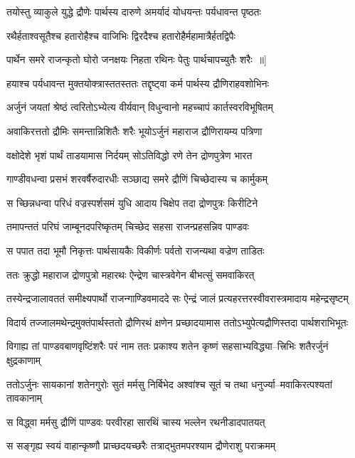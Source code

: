 \twolineshloka
{तयोस्तु व्याकुले युद्धे द्रौणेः पार्थस्य दारुणे}
{अमर्यादं योधयन्तः पर्यधावन्त पृष्ठतः}


\twolineshloka
{रथैर्हताश्वसूतैश्च हतारोहैश्च वाजिभिः}
{द्विरदैश्च हतारोहैर्महामात्रैर्हतद्विपैः}


\twolineshloka
{पार्थेन समरे राजन्कृतो घोरो जनक्षयः}
{निहता रथिनः पेतुः पार्थचापच्युतैः शरैः ॥]}


\twolineshloka
{हयाश्च पर्यधावन्त मुक्तयोक्त्रास्ततस्ततः}
{तद्दृष्ट्वा कर्म पार्थस्य द्रौणिराहवशोभिनः}


\twolineshloka
{अर्जुनं जयतां श्रेष्ठं त्वरितोऽभ्येत्य वीर्यवान्}
{विधुन्वानो महच्चापं कार्तस्वरविभूषितम्}


\twolineshloka
{अवाकिरत्ततो द्रौमिः समन्तान्निशितैः शरैः}
{भूयोऽर्जुनं महाराज द्रौणिरायम्य पत्रिणा}


\twolineshloka
{वक्षोदेशे भृशं पार्थं ताडयामास निर्दयम्}
{सोऽतिविद्धो रणे तेन द्रोणपुत्रेण भारत}


\twolineshloka
{गाण्डीवधन्वा प्रसभं शरवर्षैरुदारधीः}
{सञ्छाद्य समरे द्रौणिं चिच्छेदास्य च कार्मुकम्}


\twolineshloka
{स च्छिन्नधन्वा परिधं वज्रस्पर्शसमं युधि}
{आदाय चिक्षेप तदा द्रोणपुत्रः किरीटिने}


\twolineshloka
{तमापन्ततं परिघं जाम्बूनदपरिष्कृतम्}
{चिच्छेद सहसा राजन्प्रहसन्निव पाण्डवः}


\twolineshloka
{स पपात तदा भूमौ निकृत्तः पार्थसायकैः}
{विकीर्णः पर्वतो राजन्यथा वज्रेण ताडितः}


\twolineshloka
{ततः क्रुद्धो महाराज द्रोणपुत्रो महारथः}
{ऐन्द्रेण चास्त्रवेगेन बीभत्सुं समवाकिरत्}


\twolineshloka
{तस्येन्द्रजालावततं समीक्ष्यपार्थो राजन्गाण्डिवमाददे सः}
{ऐन्द्रं जालं प्रत्यहरत्तरस्वीवरास्त्रमादाय महेन्द्रसृष्टम्}


\twolineshloka
{विदार्य तज्जालमथेन्द्रमुक्तंपार्थस्ततो द्रौणिरथं क्षणेन}
{प्रच्छादयामास ततोऽभ्युपेत्यद्रौणिस्तदा पार्थशराभिभूतः}


\twolineshloka
{विगाह्य तां पाण्डवबाणवृष्टिंशरैः परं नाम ततः प्रकाश्य}
{शतेन कृष्णं सहसाभ्यविद्ध्या--त्त्रिभिः शतैरर्जुनं क्षुद्रकाणाम्}


\twolineshloka
{ततोऽर्जुनः सायकानां शतेनगुरोः सुतं मर्मसु निर्बिभेद}
{अश्वांश्च सूतं च तथा धनुर्ज्या--मवाकिरत्पश्यतां तावकानाम्}


\twolineshloka
{स विद्ध्वा मर्मसु द्रौणिं पाण्डवः परवीरहा}
{सारथिं चास्य भल्लेन रथनीडादपातयत्}


\twolineshloka
{स सङ्गृह्य स्वयं वाहान्कृष्णौ प्राच्छदयच्छरैः}
{तत्राद्भुतमपरश्याम द्रौणेराशु पराक्रमम्}


